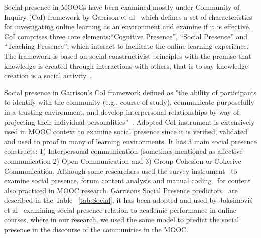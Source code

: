 \documentclass[manuscript,screen,review]{acmart}
\begin{document}
Social presence in MOOCs have been examined mostly under Community of Inquiry (CoI) framework by Garrison et al~\cite{garrison2009communities} which defines a set of characteristics for investigating online learning as an environment and examine if it is effective. CoI comprises three core elements:“Cognitive Presence”, “Social Presence” and “Teaching Presence”, which interact to facilitate the online learning experience. The framework is based on social constructivist principles with the premise that knowledge is created through interactions with others, that is to say knowledge creation is a social activity~\cite{akyol2009response}. 


Social presence in Garrison's CoI framework defined as "the ability of participants to identify with the community (e.g., course of study), communicate purposefully in a trusting environment, and
develop interpersonal relationships by way of projecting their individual personalities”~\cite{garrison2009communities}. Adopted CoI instrument is extensively used in MOOC context to examine social presence since it is verified, validated and used to proof in many of learning environments. It has 3 main social presence constructs: 1) Interpersonal communication (sometines mentioned as affective communication 2) Open Communication and 3) Group Cohesion or Cohesive Communication. Although some researchers used the survey instrument~\cite{poquet2018social} to examine social presence, forum content analysis and manual coding~\cite{oleksandra2016untangling,joksimovic2015social} for content also practiced in MOOC research. Garrisons Social Presence predictors~\cite{garrison2009communities} are described in the Table ~\ref{tab:Social}, it has been adopted and used by Joksimović et al~\cite{joksimovic2015social} examining social presence relation to academic performance in online courses, where in our research, we used the same model to predict the social presence in the discourse of the communities in the MOOC. 


 
\end{document}
